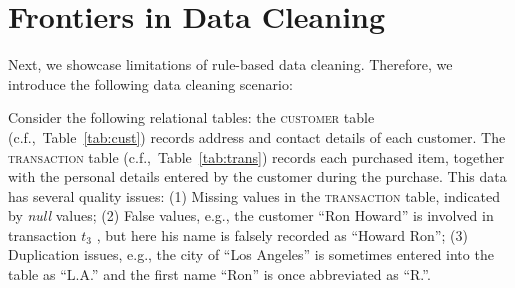 \section{Frontiers in Data Cleaning}

Next, we showcase limitations of rule-based data cleaning. Therefore, we introduce the following data cleaning scenario:
\label{sec:example}
\begin{table}[h]\footnotesize
\scriptsize
{}
\vspace{-1em}
\caption{\textsc{customer} table (with errors)}
\label{tab:cust}
\end{table}

\begin{table}[h]\footnotesize
\scriptsize
{}
\vspace{-1em}
\caption{\textsc{transaction} table (with errors)}
\label{tab:trans}
\end{table}


Consider the following relational tables: the \textsc{customer} table (c.f.,~Table~\ref{tab:cust}) records address and contact details of each customer. The \textsc{transaction} table (c.f.,~Table~\ref{tab:trans}) records each purchased item, together with the personal details entered by the customer during the purchase. 
This data has several quality issues: (1) Missing values in the \textsc{transaction} table, indicated by \emph{null} values; (2) False values, e.g.,  the customer ``Ron Howard'' is involved in transaction $t_3$ , but here his name is falsely recorded as ``Howard Ron''; (3) Duplication issues, e.g., the city of ``Los Angeles'' is sometimes entered into the table as ``L.A.'' and the first name ``Ron'' is once abbreviated as ``R.''. 

